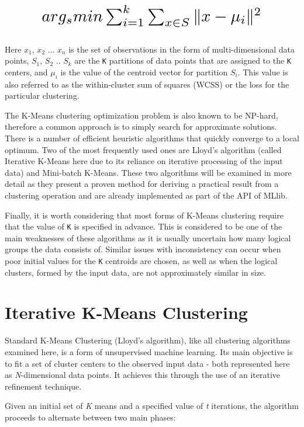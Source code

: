 \documentclass{l4proj}
\begin{document}
\[ \scalebox{2}{$ arg_{s} min \sum_{i=1}^{k}\sum_{x \in S} \|x - \mu_{i} \|^{2} $} \]\\

Here $x_{1}$, $x_{2}$ ... $x_{n}$ is the set of observations in the form of multi-dimensional data points, $S_{1}$, $S_{2}$ .. $S_{k}$ are the \texttt{K} partitions of data points that are assigned to the \texttt{K} centers, and $\mu_{i}$ is the value of the centroid vector for partition $S_{i}$. This value is also referred to as the within-cluster sum of squares (WCSS) or the loss for the particular clustering\cite{MLIntro}.

The K-Means clustering optimization problem is also known to be NP-hard, therefore  a common approach is to simply search for approximate solutions. There is a number of efficient heuristic algorithms that quickly converge to a local optimum. Two of the most frequently used ones are Lloyd's algorithm (called Iterative K-Means here due to its reliance on iterative processing of the input data) and Mini-batch K-Means. These two algorithms will be examined in more detail as they present a proven method for deriving a practical result from a clustering operation and are already implemented as part of the API of MLlib.

Finally, it is worth considering that most forms of K-Means clustering require that the value of \texttt{K} is specified in advance. This is considered to be one of the main weaknesses of these algorithms as it is usually uncertain how many logical groups the data consists of. Similar issues with inconsistency can occur when poor initial values for the \texttt{K} centroids are chosen, as well as when the logical clusters, formed by the input data, are not approximately similar in size.

\section{Iterative K-Means Clustering}

Standard K-Means Clustering (Lloyd's algorithm), like all clustering algorithms examined here, is a form of unsupervised machine learning\cite{TopTen}. Its main  objective is to fit a set of cluster centers to the observed input data - both represented here as \textit{N}-dimensional data points. It achieves this through the use of an iterative refinement technique.

Given an initial set of \textit{K} means and a specified value of \textit{t} iterations, the algorithm proceeds to alternate between two main phases:
\end{document}

